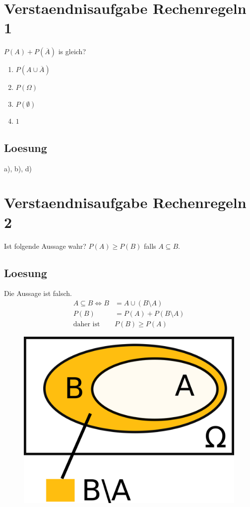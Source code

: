 \documentclass[]{article}
\begin{document}
\section{Verstaendnisaufgabe Rechenregeln 1}

$P(A) + P(\overline{A})$ is gleich?

\begin{enumerate}[label=\alph*)]
	\item $P(A \cup \overline{A})$
	\item $P(\Omega)$
	\item $P(\emptyset)$
	\item $1$
\end{enumerate}

\subsection{Loesung}

a), b), d)

\section{Verstaendnisaufgabe Rechenregeln 2}

Ist folgende Aussage wahr? $P(A) \geq P(B)$ falls $A \subseteq B$.

\subsection{Loesung}

Die Aussage ist falsch. 
\begin{equation}
	\begin{split}
		A \subseteq B \iff B & = A \cup (B \setminus A) \\
		P(B) & = P(A) + P(B \setminus A) \\
		\text{daher ist } & P(B) \geq P(A) 
	\end{split}
\end{equation}

\begin{figure}[h]
	\centering
	\includegraphics[width=0.25\columnwidth]{./verstaendnis_2/veranschaulichung.png}
\end{figure}
\end{document}
